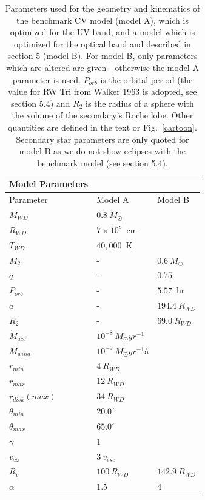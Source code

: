 \documentclass[preprint, a4paper, 11pt]{aastex}
\begin{document}
%
%


\begin{table}
\centering
\begin{tabular}{p{2cm}p{2cm}p{2cm}}
Model Parameters \\
\hline Parameter 	&	 Model A  & Model B \\ 
\hline \hline 
$M_{WD}$ 	 &	 $0.8~M_{\odot}$  &     \\ 
$R_{WD}$ 	 &	 $7\times10^{8}$~cm  & \\ 
$T_{WD}$ 	 &	 $40,000$~K        &  \\
$M_{2}$ 	& -&	 $0.6~M_{\odot}$   \\ 
$q$ 	&- &	 $0.75$   \\ 
$P_{orb}$ 	&- &	 $5.57$~hr   \\ 
$a$ 	& -&	 $194.4~R_{WD}$   \\ 
$R_2$   &   -  &	 $69.0~R_{WD}$  \\ 
$\dot{M}_{acc}$ 	 &	 $10^{-8}~M_{\odot}yr^{-1}$  &\\ 
$\dot{M}_{wind}$  &	$10^{-9}~M_{\odot}yr^{-1}$å  & \\ 
$r_{min}$ 	&	 $4~R_{WD}$ &  \\ 
$r_{max}$ 	&	 $12~R_{WD}$  &  \\ 
$r_{disk} (max)$ 	&	 $34~R_{WD}$  &  \\ 
$\theta_{min}$ 	&	 $20.0^{\circ}$  &  \\ 
$\theta_{max}$ 	&	 $65.0^{\circ}$  &  \\ 
$\gamma$ 	&	 $1$  &  \\ 
$v_{\infty}$ 	&	 $3~v_{esc}$  &  \\ 
$R_v$ 	        &	 $100~R_{WD}$  &  $142.9~R_{WD}$  \\ 
$\alpha$ 	&	 $1.5$   &   $4$\\
\end{tabular}
\centering
\caption{
Parameters used for the geometry and kinematics of the benchmark 
CV model (model A), which is optimized for the UV band, and a model
which is optimized for the optical band and described in section 5 (model B).
For model B, only parameters which are altered are given - otherwise the
model A parameter is used. $P_{orb}$ is the orbital period 
(the value for RW Tri from Walker 1963 is adopted, see section 5.4) and 
$R_2$ is the radius of a sphere with the volume of the secondary's Roche lobe. 
Other quantities are defined in the text or Fig.~\ref{cartoon}.
Secondary star parameters are only quoted for 
model B as we do not show eclipses with the 
benchmark model (see section 5.4).
}
\label{wind_param}
\label{modelb_table}
\end{table}
\end{document}
